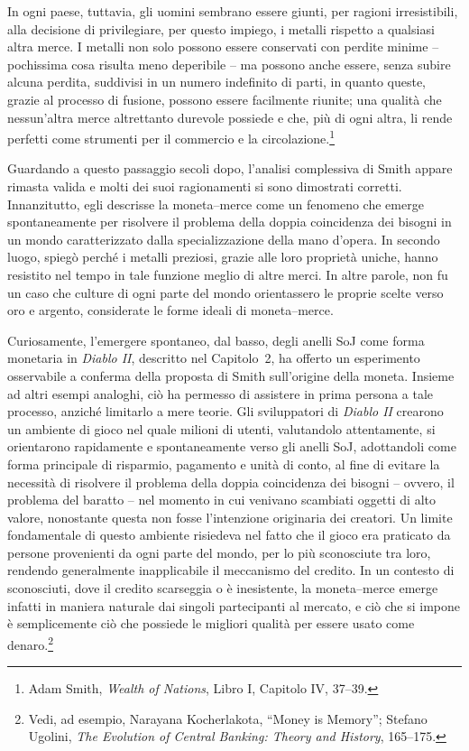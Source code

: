 \documentclass[
  a5paper,
  smalldemyvopaper,10pt,twoside,onecolumn,openright,extrafontsizes,hidelinks]{memoir}
\renewenvironment{quote}%
               {\list{}{\rightmargin=.6cm\leftmargin=.6cm}%
                \itshape \item[]}%
               {\endlist}
\begin{document}
\begin{quote}
In ogni paese, tuttavia, gli uomini sembrano essere giunti, per ragioni
irresistibili, alla decisione di privilegiare, per questo impiego, i
metalli rispetto a qualsiasi altra merce. I metalli non solo possono
essere conservati con perdite minime -- pochissima cosa risulta meno
deperibile -- ma possono anche essere, senza subire alcuna perdita,
suddivisi in un numero indefinito di parti, in quanto queste, grazie al
processo di fusione, possono essere facilmente riunite; una qualità che
nessun'altra merce altrettanto durevole possiede e che, più di ogni
altra, li rende perfetti come strumenti per il commercio e la
circolazione.\footnote{Adam Smith, \emph{Wealth of Nations}, Libro I,
  Capitolo IV, 37--39.}
\end{quote}

Guardando a questo passaggio secoli dopo, l'analisi complessiva di Smith
appare rimasta valida e molti dei suoi ragionamenti si sono dimostrati
corretti. Innanzitutto, egli descrisse la moneta--merce come un fenomeno
che emerge spontaneamente per risolvere il problema della doppia
coincidenza dei bisogni in un mondo caratterizzato dalla
specializzazione della mano d'opera. In secondo luogo, spiegò perché i
metalli preziosi, grazie alle loro proprietà uniche, hanno resistito nel
tempo in tale funzione meglio di altre merci. In altre parole, non fu un
caso che culture di ogni parte del mondo orientassero le proprie scelte
verso oro e argento, considerate le forme ideali di moneta--merce.

Curiosamente, l'emergere spontaneo, dal basso, degli anelli SoJ come
forma monetaria in \emph{Diablo II}, descritto nel Capitolo~2, ha
offerto un esperimento osservabile a conferma della proposta di Smith
sull'origine della moneta. Insieme ad altri esempi analoghi, ciò ha
permesso di assistere in prima persona a tale processo, anziché
limitarlo a mere teorie. Gli sviluppatori di \emph{Diablo II} crearono
un ambiente di gioco nel quale milioni di utenti, valutandolo
attentamente, si orientarono rapidamente e spontaneamente verso gli
anelli SoJ, adottandoli come forma principale di risparmio, pagamento e
unità di conto, al fine di evitare la necessità di risolvere il problema
della doppia coincidenza dei bisogni -- ovvero, il problema del baratto
-- nel momento in cui venivano scambiati oggetti di alto valore,
nonostante questa non fosse l'intenzione originaria dei creatori. Un
limite fondamentale di questo ambiente risiedeva nel fatto che il gioco
era praticato da persone provenienti da ogni parte del mondo, per lo più
sconosciute tra loro, rendendo generalmente inapplicabile il meccanismo
del credito. In un contesto di sconosciuti, dove il credito scarseggia o
è inesistente, la moneta--merce emerge infatti in maniera naturale dai
singoli partecipanti al mercato, e ciò che si impone è semplicemente ciò
che possiede le migliori qualità per essere usato come
denaro.\footnote{Vedi, ad esempio, Narayana Kocherlakota, ``Money is
  Memory''; Stefano Ugolini, \emph{The Evolution of Central Banking:
  Theory and History}, 165--175.}
\end{document}
